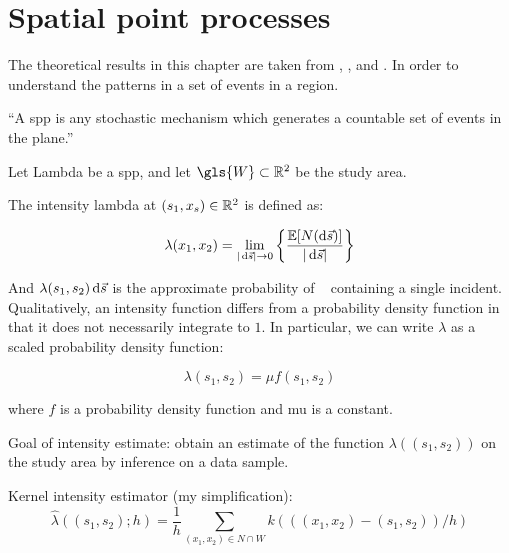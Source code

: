 

\section{Spatial point processes}
\label{sec:theory:spatial_point_processes}

The theoretical results in this chapter are taken from \citet{diggle1988equivalence}, \citet{guan2008consistent}, and \citet{wand1994kernel}.
In order to understand the patterns in a set of events in a region.

\begin{defn}
``A \gls{spp} is any stochastic mechanism which generates a countable set of events in the plane.''
\end{defn}

Let \gls{Lambda} be a \gls{spp}, and let \(\gls{W} \subset \RS \) be the study area.

The intensity \gls{lambda} at \((s_1, x_s) \in \mathbb{R}^2\) is defined as:

\begin{equation}
\label{eq:lambda_differential}
    \lambda (x_1, x_2) = \lim_{|\ds| \to 0}
        \left\{
            \frac{\mathbb{E}[N(\ds)]}%
            {|\ds|}
        \right\}
\end{equation}

And \(\lambda(s_1, s_2) \mathop{}\!\mathrm{d}{\vec{s}}\) is the approximate probability of \ds~ containing a single incident.
Qualitatively, an intensity function differs from a probability density function in that it does not necessarily integrate to \(1\).
In particular, we can write \(\lambda\) as a scaled probability density function:

\begin{equation}
\label{eq:lambda_mu}
    \lambda(s_1, s_2) = \mu f\!(s_1, s_2)
\end{equation}

where \(f\) is a probability density function and \gls{mu} is a constant.

Goal of intensity estimate: obtain an estimate of the function \(\lambda((s_1, s_2))\) on the study area by inference on a data sample.

Kernel intensity estimator (my simplification):
\begin{equation}
\label{eq:lambda_hat}
    \hat{\lambda}((s_1, s_2); h) 
        = \frac{1}{h} \sum_{(x_1, x_2) \in N \cap W}
            {k(((x_1, x_2)-(s_1, s_2))/h)}
\end{equation}

